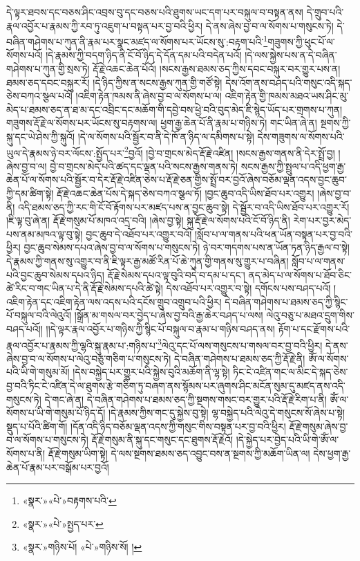 དེ་ལྟར་ཐབས་དང་བཅས་ཤིང་འབྲས་བུ་དང་བཅས་པའི་ཐུགས་ཡང་དག་པར་བསྐུལ་བ་བསྟན་ནས། དེ་གྲུབ་པའི་རྣལ་འབྱོར་པ་རྣམས་ཀྱི་རབ་ཏུ་འཇུག་པ་བསྟན་པར་བྱ་བའི་ཕྱིར། དེ་ནས་ཞེས་བྱ་བ་ལ་སོགས་པ་གསུངས་ཏེ། དེ་བཞིན་གཤེགས་པ་ཀུན་ནི་རྣམ་པར་སྣང་མཛད་ལ་སོགས་པར་ཡོངས་སུ་:བརྟག་པའི་\footnote{«སྣར་»«པེ་»བརྟགས་པའི་}གཟུགས་ཀྱི་ཕུང་པོ་ལ་སོགས་པའོ། །དེ་རྣམས་ཀྱི་བདག་ཉིད་ནི་ངོ་བོ་ཉིད་དེ་དོན་དམ་པའི་བདེན་པའོ། །དེ་ལས་སྐྱེས་པས་ན་དེ་བཞིན་གཤེགས་པ་ཀུན་གྱི་སྲས་ཏེ། རྡོ་རྗེ་འཆང་ཆེན་པོའོ། །སངས་རྒྱས་ཐམས་ཅད་ཀྱིས་དབང་བསྐུར་བར་གྱུར་པས་ན། ཐམས་ཅད་དབང་བསྐུར་རོ། །དེ་ཉིད་ཀྱིས་ན་སངས་རྒྱས་ཀུན་གྱི་གཙོ་སྟེ། དེས་འོག་ནས་བཤད་པའི་གསུང་འདི་སྐད་ཅེས་བཀའ་སྩལ་པའོ། །འཇིག་རྟེན་ཁམས་ནི་ཞེས་བྱ་བ་ལ་སོགས་པ་ལ། འཇིག་རྟེན་གྱི་ཁམས་མཐའ་ཡས་ཤིང་མུ་མེད་པ་ཐམས་ཅད་ན་ཐ་མ་དང་འབྲིང་དང་མཆོག་གི་དབྱེ་བས་ཕྱེ་བའི་བུད་མེད་ཇི་སྙེད་ཡོད་པར་གྲགས་པ་ཀུན། གཟུགས་རྡོ་རྗེ་ལ་སོགས་པར་ཡོངས་སུ་བརྟགས་ལ། ཕྱག་རྒྱ་ཆེན་པོ་ནི་རྣམ་པ་གཉིས་ཏེ། གང་ཡིན་ཞེ་ན། སྔགས་ཀྱི་སྐུ་དང་ཡེ་ཤེས་ཀྱི་སྐུའོ། །དེ་ལ་སོགས་པའི་སྦྱོར་བ་ནི་དེ་ཁོ་ན་ཉིད་ལ་དམིགས་པ་སྟེ། དེས་གཟུགས་ལ་སོགས་པའི་ཡུལ་དེ་རྣམས་ཉེ་བར་ལོངས་:སྤྱོད་པར་\footnote{«སྣར་»«པེ་»སྤྱད་པར་}བྱའོ། །བྱེ་བ་གྲངས་མེད་རྡོ་རྗེ་འཛིན། །སངས་རྒྱས་གནས་ནི་དེར་སྤྲོ་བྱ། །ཞེས་བྱ་བ་ལ། བྱེ་བ་གྲངས་མེད་པའི་ཚད་དང་ལྡན་པའི་སངས་རྒྱས་གནས་ཏེ། སངས་རྒྱས་ཀྱི་སྤྲུལ་པ་འདི་ཕྱག་རྒྱ་ཆེན་པོ་ལ་སོགས་པའི་སྦྱོར་བ་དེར་རྡོ་རྗེ་འཛིན་ཅེས་པ་རྡོ་རྗེ་ཅན་གྱིས་སྤྲོ་བར་བྱའོ་ཞེས་བཅོམ་ལྡན་འདས་བྱང་ཆུབ་ཀྱི་དམ་ཚིག་སྟེ། རྡོ་རྗེ་འཆང་ཆེན་པོས་དེ་སྐད་ཅེས་བཀའ་སྩལ་ཏོ། །བྱང་ཆུབ་འདི་ཡིས་ཐོབ་པར་འགྱུར། །ཞེས་བྱ་བ་ནི། འདི་ཐམས་ཅད་ཀྱི་རང་གི་ངོ་བོ་རྟོགས་པར་མཛད་པས་ན་བྱང་ཆུབ་སྟེ། དེ་སྦྱོར་བ་འདི་ཡིས་ཐོབ་པར་འགྱུར་རོ། །ཇི་ལྟ་བུ་ཞེ་ན། རྡོ་རྗེ་གསུམ་པོ་མཁའ་འདྲ་བའི། །ཞེས་བྱ་སྟེ། སྐུ་རྡོ་རྗེ་ལ་སོགས་པའི་ངོ་བོ་ཉིད་ནི། རེག་པར་བྱར་མེད་པས་ནམ་མཁའ་ལྟ་བུ་སྟེ། བྱང་ཆུབ་དེ་འཐོབ་པར་འགྱུར་བའོ། །སློབ་པ་ལ་གནས་པའི་ཕན་ཡོན་བསྟན་པར་བྱ་བའི་ཕྱིར། བྱང་ཆུབ་སེམས་དཔའ་ཞེས་བྱ་བ་ལ་སོགས་པ་གསུངས་ཏེ། ཉེ་བར་གདགས་པས་ན་ཡོན་ཏན་ཉིད་རྒྱལ་བ་སྟེ། དེ་རྣམས་ཀྱི་གནས་སུ་འགྱུར་བ་ནི་ཇི་ལྟར་རྒྱ་མཚོ་རིན་པོ་ཆེ་ཀུན་གྱི་གནས་སུ་གྱུར་པ་བཞིན། སློབ་པ་ལ་གནས་པའི་བྱང་ཆུབ་སེམས་དཔའ་ཉིད། རྡོ་རྗེ་སེམས་དཔའ་ལྟ་བུའི་བདེ་བ་དམ་པ་དང་། ནད་མེད་པ་ལ་སོགས་པ་ཐོབ་ཅིང་ཚེ་རིང་བ་གང་ཡིན་པ་དེ་ནི་རྡོ་རྗེ་སེམས་དཔའི་ཚེ་སྟེ། དེས་འཐོབ་པར་འགྱུར་བ་སྟེ། དགོངས་པས་བཤད་པའོ། །འཇིག་རྟེན་དང་འཇིག་རྟེན་ལས་འདས་པའི་དངོས་གྲུབ་འགྲུབ་པའི་ཕྱིར། དེ་བཞིན་གཤེགས་པ་ཐམས་ཅད་ཀྱི་སྙིང་པོ་བསྐུལ་བའི་ལེའུའོ། །སྒྲོན་མ་གསལ་བར་བྱེད་པ་ཞེས་བྱ་བའི་རྒྱ་ཆེར་བཤད་པ་ལས། ལེའུ་བཅུ་པ་མཐའ་དྲུག་གིས་བཤད་པའོ།། །།དེ་ལྟར་རྣལ་འབྱོར་པ་གཉིས་ཀྱི་སྙིང་པོ་བསྐུལ་བ་རྣམ་པ་གཉིས་བཤད་ནས། རྟོག་པ་དང་རྫོགས་པའི་རྣལ་འབྱོར་པ་རྣམས་ཀྱི་ལྷའི་སྐུ་རྣམ་པ་:གཉིས་པ་\footnote{«སྣར་»གཉིས་པོ། «པེ་»གཉིས་སོ། །}ལེའུ་དང་པོ་ལས་གསུངས་པ་གསལ་བར་བྱ་བའི་ཕྱིར། དེ་ནས་ཞེས་བྱ་བ་ལ་སོགས་པ་ལེའུ་བཅུ་གཅིག་པ་གསུངས་ཏེ། དེ་བཞིན་གཤེགས་པ་ཐམས་ཅད་ཀྱི་རྡོ་རྗེ་ནི། ཨོཾ་ལ་སོགས་པའི་ཡི་གེ་གསུམ་མོ། །དེས་བསྐྱེད་པར་གྱུར་པའི་སྐྱེས་བུའི་མཆོག་ནི་ལྷ་སྟེ། ཏིང་ངེ་འཛིན་གང་ལ་མིང་དེ་སྐད་ཅེས་བྱ་བའི་ཏིང་ངེ་འཛིན་དེ་ལ་ཐུགས་རྩེ་གཅིག་ཏུ་བཞག་ནས་སྙོམས་པར་ཞུགས་ཤིང་མངོན་སུམ་དུ་མཛད་ནས་འདི་གསུངས་ཏེ། དེ་གང་ཞེ་ན། དེ་བཞིན་གཤེགས་པ་ཐམས་ཅད་ཀྱི་སྔགས་གསང་བར་གྱུར་པའི་རྡོ་རྗེ་རིག་པ་ནི། ཨོཾ་ལ་སོགས་པ་ཡི་གེ་གསུམ་པོ་ཉིད་དོ། །དེ་རྣམས་ཀྱིས་གང་དུ་སྐྱེས་བུ་སྟེ། ལྷ་བསྐྱེད་པའི་ལེའུ་དེ་གསུངས་སོ་ཞེས་པ་སྟེ། སྡུད་པ་པོའི་ཚིག་གོ། །དོན་འདི་ཉིད་བཅོམ་ལྡན་འདས་ཀྱི་གསུང་གིས་བསྟན་པར་བྱ་བའི་ཕྱིར། རྡོ་རྗེ་གསུམ་ཞེས་བྱ་བ་ལ་སོགས་པ་གསུངས་ཏེ། རྡོ་རྗེ་གསུམ་ནི་སྐུ་དང་གསུང་དང་ཐུགས་རྡོ་རྗེའོ། །དེ་སྐྱེད་པར་བྱེད་པའི་ཡི་གེ་ཨོཾ་ལ་སོགས་པ་ནི། རྡོ་རྗེ་གསུམ་ཡིག་སྟེ། དེ་ལས་སྔགས་ཐམས་ཅད་འབྱུང་བས་ན་སྔགས་ཀྱི་མཆོག་ཡིན་ལ། དེས་ཕྱག་རྒྱ་ཆེན་པོ་རྣམ་པར་བསྒོམ་པར་བྱའོ། 